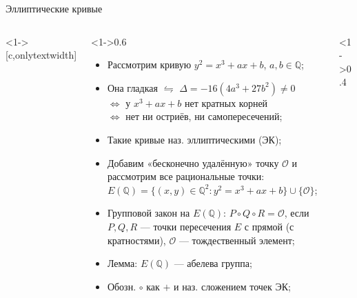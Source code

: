 \documentclass[serif, aspectratio=169]{beamer}
\begin{document}
\begin{frame}{Эллиптические кривые}
    \begin{columns}<1->[c,onlytextwidth]
        \begin{column}<1->{0.6\textwidth}
            \begin{itemize}
                \item Рассмотрим кривую $y^2 = x^3+ax+b$, $a,b\in\mathbb{Q}$;
                \item Она гладкая $\leftrightharpoons$ $\Delta=-16(4a^3+27b^2)\ne0$\\
                $\Leftrightarrow$ у $x^3+ax+b$ нет кратных корней\\ 
                $\Leftrightarrow$ нет ни остриёв, ни самопересечений;
                \item Такие кривые наз. эллиптическими (ЭК);
                \item Добавим «бесконечно удалённую» точку $\mathcal{O}$ и рассмотрим все рациональные точки: $E(\mathbb{Q})=\{(x,y)\in\mathbb{Q}^2: y^2 = x^3+ax+b\}\cup\{\mathcal{O}\}$;
                \item Групповой закон на $E(\mathbb{Q})$: $P\circ Q\circ R=\mathcal{O}$, если $P,Q,R$ --- точки пересечения $E$ с прямой (с кратностями), $\mathcal{O}$ --- тождественный элемент;
                \item Лемма: $E(\mathbb{Q})$ --- абелева группа;
                \item Обозн. $\circ$ как $+$ и наз. сложением точек ЭК;
                
            \end{itemize}
        \end{column}
        \begin{column}<1->{0.4\textwidth}
            \begin{center}
\end{center}
\end{column}
\end{columns}
\end{frame}
\end{document}
